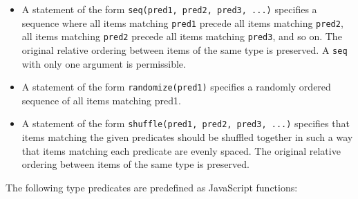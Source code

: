 \documentclass[
]{article}
\begin{document}
\begin{itemize}
\item
  A statement of the form \texttt{seq(pred1,\ pred2,\ pred3,\ ...)}
  specifies a sequence where all items matching \texttt{pred1} precede
  all items matching \texttt{pred2}, all items matching \texttt{pred2}
  precede all items matching \texttt{pred3}, and so on. The original
  relative ordering between items of the same type is preserved. A
  \texttt{seq} with only one argument is permissible.
\item
  A statement of the form \texttt{randomize(pred1)} specifies a randomly
  ordered sequence of all items matching pred1.
\item
  A statement of the form \texttt{shuffle(pred1,\ pred2,\ pred3,\ ...)}
  specifies that items matching the given predicates should be shuffled
  together in such a way that items matching each predicate are evenly
  spaced. The original relative ordering between items of the same type
  is preserved.
\end{itemize}

The following type predicates are predefined as JavaScript functions:
\end{document}
